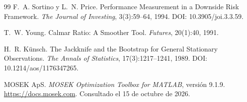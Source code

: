 \documentclass[11pt]{article}
\begin{document}
\begin{thebibliography}{99}
F.~A. Sortino y L.~N. Price.
\newblock Performance Measurement in a Downside Risk Framework.
\newblock \emph{The Journal of Investing}, 3(3):59--64, 1994.
\newblock DOI: 10.3905/joi.3.3.59.

T.~W. Young.
\newblock Calmar Ratio: A Smoother Tool.
\newblock \emph{Futures}, 20(1):40, 1991.

H.~R. K{\"u}nsch.
\newblock The Jackknife and the Bootstrap for General Stationary Observations.
\newblock \emph{The Annals of Statistics}, 17(3):1217--1241, 1989.
\newblock DOI: 10.1214/aos/1176347265.


MOSEK ApS.
\newblock \emph{MOSEK Optimization Toolbox for MATLAB}, versión 9.1.9.
\newblock \url{https://docs.mosek.com}.
\newblock Consultado el 15 de octubre de 2026.
\end{thebibliography}
\end{document}
